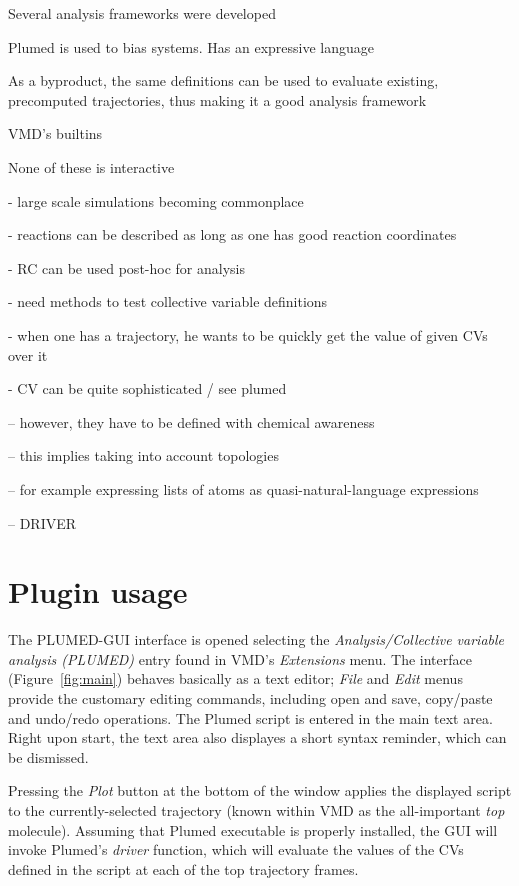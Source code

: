 \documentclass[preprint,12pt]{elsarticle}
\begin{document}
Several analysis frameworks were developed

Plumed is used to bias systems. Has an expressive language 

As a byproduct, the same definitions can be used to evaluate
existing, precomputed trajectories, thus making it  a good analysis
framework


VMD's builtins

None of these is interactive







- large scale simulations becoming commonplace

- reactions can be described as long as one has good reaction coordinates

- RC can be used post-hoc for analysis

- need methods to test collective variable definitions

- when one has a trajectory, he wants to be quickly get the value of given CVs over it

- CV can be quite sophisticated / see plumed 

-- however, they have to be defined with chemical awareness

-- this implies taking into account topologies

-- for example expressing lists of atoms as quasi-natural-language expressions

-- DRIVER


\section{Plugin usage}

The PLUMED-GUI interface is opened selecting the
\emph{Analysis/Collective variable analysis (PLUMED)} entry found in
VMD's \emph{Extensions} menu.  The interface (Figure~\ref{fig:main})
behaves basically as a text editor; \emph{File} and \emph{Edit} menus
provide the customary editing commands, including  open and save,
copy/paste and undo/redo operations.  The Plumed script is entered in the main
text area.   Right upon start, the text area also displayes a
short syntax reminder, which can be dismissed. 

Pressing the \emph{Plot} button at the bottom of the window applies the displayed
script to the currently-selected trajectory (known within VMD as the
all-important \emph{top} molecule). Assuming that Plumed executable is
properly installed, the GUI will invoke Plumed's \emph{driver} function,
which will evaluate the values of the CVs defined in the script at each
of the top trajectory frames.
\end{document}
